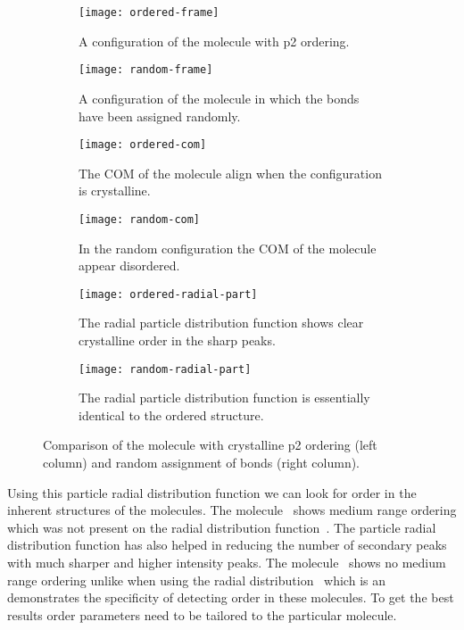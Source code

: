 \begin{figure}
    \begin{subfigure}[t]{0.5\linewidth}
        \texttt{[image: ordered-frame]}
        \caption{A configuration of the \dcon molecule with p2 ordering.}
        \label{fig:ordered frame}
    \end{subfigure}
    \begin{subfigure}[t]{0.5\linewidth}
        \texttt{[image: random-frame]}
        \caption{A configuration of the \dcon molecule in which the bonds have been assigned randomly.}
        \label{fig:random frame}
    \end{subfigure}
    \begin{subfigure}[t]{0.5\linewidth}
        \texttt{[image: ordered-com]}
        \caption{The COM of the \dcon molecule align when the configuration is crystalline.}
        \label{fig:ordered com}
    \end{subfigure}
    \begin{subfigure}[t]{0.5\linewidth}
        \texttt{[image: random-com]}
        \caption{In the random configuration the COM of the \dcon molecule appear disordered.}
        \label{fig:random com}
    \end{subfigure}
    \begin{subfigure}[t]{0.5\linewidth}
        \texttt{[image: ordered-radial-part]}
        \caption{The radial particle distribution function shows clear crystalline order in the sharp peaks.}
        \label{fig:ordered radial part}
    \end{subfigure}
    \begin{subfigure}[t]{0.5\linewidth}
        \texttt{[image: random-radial-part]}
        \caption{The radial particle distribution function is essentially identical to the ordered structure.}
        \label{fig:random radial part}
    \end{subfigure}
    \caption{Comparison of the \dcon molecule with crystalline p2 ordering (left column) and random assignment of bonds (right column).}
    \label{fig:compact bonds}
\end{figure}


Using this particle radial distribution function we can look for order in the inherent structures of the molecules. The \dcon molecule~ shows medium range ordering which was not present on the radial distribution function~. The particle radial distribution function has also helped in reducing the number of secondary peaks with much sharper and higher intensity peaks. The \done molecule~ shows no medium range ordering unlike when using the radial distribution~ which is an demonstrates the specificity of detecting order in these molecules. To get the best results order parameters need to be tailored to the particular molecule.

